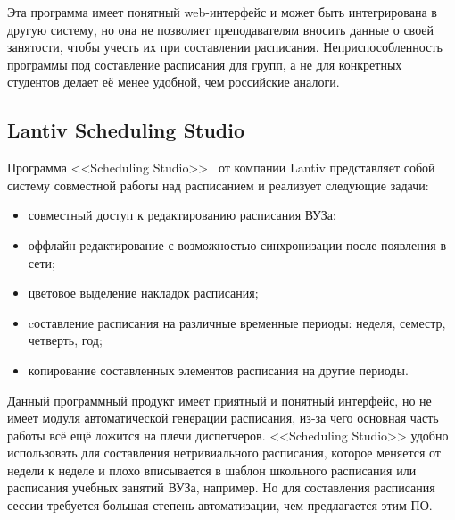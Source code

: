 Эта программа имеет понятный web-интерфейс и может быть интегрирована в другую систему, но она не позволяет преподавателям вносить данные о своей занятости, чтобы учесть их при составлении расписания. Неприспособленность программы под составление расписания для групп, а не для конкретных студентов делает её менее удобной, чем российские аналоги.

\subsection {Lantiv Scheduling Studio} 
Программа <<Scheduling Studio>>~\cite{lantiv} от компании Lantiv представляет собой систему совместной работы над расписанием и реализует следующие задачи:

\begin{itemize}
	\item совместный доступ к редактированию расписания ВУЗа;
	\item оффлайн редактирование с возможностью синхронизации после появления в сети;
	\item цветовое выделение накладок расписания;
	\item cоставление расписания на различные временные периоды: неделя, семестр, четверть, год;
	\item копирование составленных элементов расписания на другие периоды.
\end{itemize}

Данный программный продукт имеет приятный и понятный интерфейс, но не имеет модуля автоматической генерации расписания, из-за чего основная часть работы всё ещё ложится на плечи диспетчеров. <<Scheduling Studio>> удобно использовать для составления нетривиального расписания, которое меняется от недели к неделе и плохо вписывается в шаблон школьного расписания или расписания учебных занятий ВУЗа, например. Но для составления расписания сессии требуется большая степень автоматизации, чем предлагается этим ПО.


